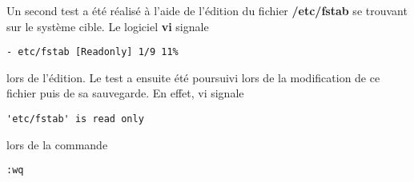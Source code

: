 Un second test a été réalisé à l'aide de l'édition du fichier \textbf{/etc/fstab} se trouvant sur le système cible. Le logiciel \textbf{vi} signale
\begin{lstlisting}[style=Bash]
- etc/fstab [Readonly] 1/9 11%
\end{lstlisting}
lors de l'édition. Le test a ensuite été poursuivi lors de la modification de ce fichier puis de sa sauvegarde. En effet, vi signale
\begin{lstlisting}[style=Bash]
'etc/fstab' is read only
\end{lstlisting}
lors de la commande
\begin{lstlisting}[style=Bash]
:wq
\end{lstlisting}
